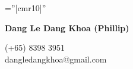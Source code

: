 \documentclass[10pt]{article}
\newcommand{\blackhref}[3][black]{\href{#2}{\color{#1}{#3}}}
\begin{document}
    \pagestyle{empty}       %
    \font\fb=''[cmr10]''    %

    \begin{multicols}{2}
        \begin{flushleft}
            \textbf{{\huge Dang Le Dang Khoa (Phillip)}}
        \end{flushleft}

        \columnbreak

        \begin{flushright}
            \normalsize (+65) 8398 3951 \faPhoneSquare \\
            dangledangkhoa@gmail.com \faEnvelopeSquare \\
            \blackhref{https://github.com/dangkhoadl}{github.com/dangkhoadl} \faGithub \\
            \blackhref{https://sg.linkedin.com/in/dangledangkhoa}{linkedin.com/in/dangledangkhoa} \faLinkedinSquare
        \end{flushright}
    \end{multicols}

    \vspace{-8mm}
    
    \vspace{2mm}
    
    \vspace{2mm}
	
    \vspace{2mm}
	
    \vspace{2mm}
	
    \vspace{2mm}
    
\end{document}
